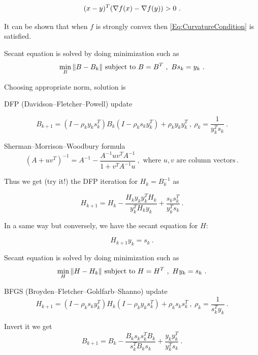 \begin{equation}\label{Eq:CurvatureCondition}
(x-y)^T(\nabla f(x)-\nabla f(y))>0 \ .
\end{equation}

It can be shown that when $f$ is strongly convex then \eqref{Eq:CurvatureCondition} is satisfied. 

Secant equation is solved by doing minimization such as
$$\min\li_{B}\|B-B_k\| \text{ subject to } B=B^T  \ , \ Bs_k=y_k \ .$$

Choosing appropriate norm, solution is

DFP (Davidson--Fletcher--Powell) update

\begin{equation}\label{Eq:Quasi-NewtonDFPUpdateB}
B_{k+1}=(I-\rho_ky_ks_k^T)B_k(I-\rho_ks_ky_k^T)+\rho_ky_ky_k^T \ , \ \rho_k=\dfrac{1}{y_k^Ts_k} \ .
\end{equation}

Sherman--Morrison--Woodbury formula
$$(A+uv^T)^{-1}=A^{-1}-\dfrac{A^{-1}uv^TA^{-1}}{1+v^TA^{-1}u} \ , \text{ where } u, v \text{ are column vectors} \ .$$

Thus we get (try it!) the DFP iteration for $H_k=B_k^{-1}$ as

\begin{equation}\label{Eq:Quasi-NewtonDFPUpdateH}
H_{k+1}=H_k-\dfrac{H_ky_ky_k^TH_k}{y_k^TH_ky_k}+\dfrac{s_ks_k^T}{y_k^Ts_k} \ .
\end{equation}

In a same way but conversely, we have the secant equation for $H$:

\begin{equation}\label{Eq:Quasi-NewtonSecantEquationH}
H_{k+1}y_k=s_k \ .
\end{equation}

Secant equation is solved by doing minimization such as
$$\min\li_{H}\|H-H_k\| \text{ subject to } H=H^T  \ , \ Hy_k=s_k \ .$$


BFGS (Broyden--Fletcher--Goldfarb--Shanno) update
\begin{equation}\label{Eq:Quasi-NewtonBFGSUpdateH}
H_{k+1}=(I-\rho_ks_ky_k^T)H_k(I-\rho_ky_ks_k^T)+\rho_ks_ks_k^T \ , \ \rho_k=\dfrac{1}{s_k^Ty_k} \ .
\end{equation}

Invert it we get
\begin{equation}\label{Eq:Quasi-NewtonBFGSUpdateB}
B_{k+1}=B_k-\dfrac{B_ks_ks_k^TB_k}{s_k^TB_ks_k}+\dfrac{y_ky_k^T}{y_k^Ts_k} \ .
\end{equation}


